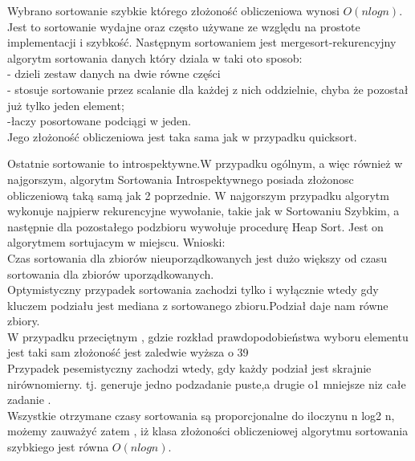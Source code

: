 \documentclass[11pt]{article}
\begin{document}
\newpage 
 Wybrano sortowanie szybkie którego złożoność obliczeniowa wynosi $O(n log n)$.\\Jest to sortowanie wydajne oraz często używane ze względu na prostote implementacji i szybkość. 
Następnym sortowaniem  jest mergesort-rekurencyjny algorytm sortowania danych który dziala w taki oto  sposob:
   \\- dzieli zestaw danych na dwie równe części
  \\-  stosuje sortowanie przez scalanie dla każdej z nich oddzielnie, chyba że pozostał już tylko jeden element;
   \\ -łaczy posortowane podciągi w jeden.
\\Jego złożoność  obliczeniowa jest taka sama jak w przypadku quicksort.

Ostatnie sortowanie to introspektywne.W przypadku ogólnym, a więc  również w najgorszym, algorytm Sortowania Introspektywnego posiada złożonosc obliczeniową taką samą jak 2  poprzednie.
W najgorszym przypadku algorytm wykonuje najpierw rekurencyjne wywołanie, takie jak w Sortowaniu Szybkim, a następnie dla pozostałego podzbioru wywołuje procedurę Heap Sort. Jest on algorytmem sortujacym w miejscu.
\newpage 
Wnioski:
\\Czas sortowania dla zbiorów nieuporządkowanych jest dużo większy od czasu sortowania dla zbiorów uporządkowanych.
\\Optymistyczny przypadek sortowania zachodzi tylko i wyłącznie wtedy gdy kluczem podziału jest mediana z sortowanego zbioru.Podział daje nam równe zbiory.
\\ W przypadku przeciętnym , gdzie rozkład prawdopodobieństwa wyboru elementu jest taki sam złożoność jest zaledwie wyższa o 39%
\\ Przypadek pesemistyczny zachodzi wtedy, gdy każdy podział jest skrajnie nirównomierny. tj. generuje jedno podzadanie puste,a drugie o1 mniejsze niz całe zadanie .
\\Wszystkie otrzymane czasy sortowania są proporcjonalne do iloczynu n log2 n, możemy zauważyć zatem , iż klasa złożoności obliczeniowej algorytmu sortowania szybkiego jest równa $O(n log n)$.


 
\end{document}
